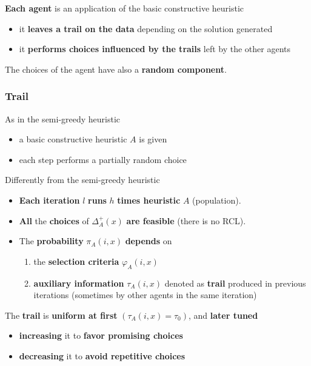 \documentclass[11pt]{article}
\begin{document}
	\textbf{Each agent} is an application of the basic constructive heuristic
	\begin{itemize}
		\item it \textbf{leaves a trail on the data} depending on the solution generated
		
		\item it \textbf{performs choices influenced by the trails} left by the other agents
	\end{itemize}
	
	The choices of the agent have also a \textbf{random component}.\\
	
	\newpage
	
	\subsubsection{Trail}
	As in the semi-greedy heuristic
	\begin{itemize}
		\item a basic constructive heuristic $A$ is given
		\item each step performs a partially random choice
	\end{itemize}
	
	Differently from the semi-greedy heuristic
	\begin{itemize}
		\item \textbf{Each iteration} $l$ \textbf{runs} $h$ \textbf{times heuristic} $A$ (population).\\
		
		\item \textbf{All} the \textbf{choices} of $\Delta_A^+ (x)$ \textbf{are feasible} (there is no RCL).\\
		
		\item The \textbf{probability} $\pi_A (i, x)$ \textbf{depends} on
		\begin{enumerate}
			\item the \textbf{selection criteria} $\varphi_A (i, x)$
			
			\item \textbf{auxiliary information} $\tau_A (i, x)$ denoted as \textbf{trail} produced in previous iterations (sometimes by other agents in the same iteration)
		\end{enumerate}
		\nn
	\end{itemize}
	
	The \textbf{trail} is \textbf{uniform at first} $(\tau_A (i, x) = \tau_0)$, and \textbf{later tuned}
	\begin{itemize}
		\item \textbf{increasing} it to \textbf{favor promising choices}
		\item \textbf{decreasing} it to \textbf{avoid repetitive choices}
	\end{itemize}
	
\end{document}
